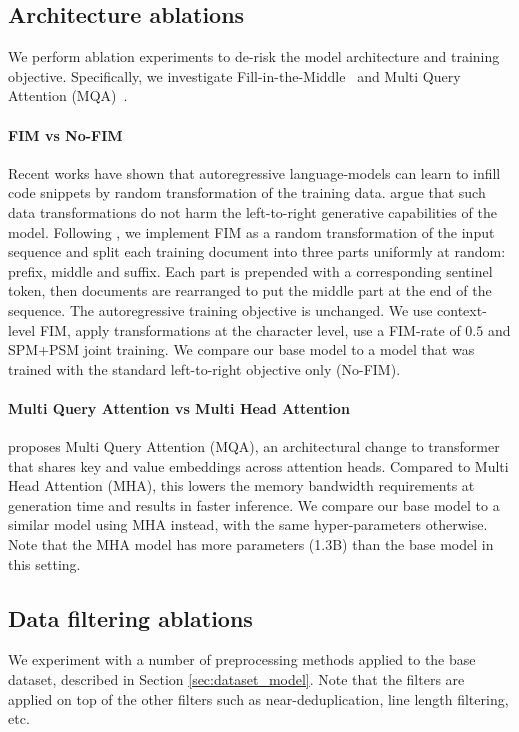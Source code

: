 \documentclass[10pt]{article} \usepackage{iclr2023_conference,times}
\begin{document}
\subsection{Architecture ablations}

We perform ablation experiments to de-risk the model architecture and training objective. Specifically, we investigate Fill-in-the-Middle~\citep{bavarian2022fim} and Multi Query Attention (MQA)~\citep{shazeer2019mqa}.


\paragraph{FIM vs No-FIM}
Recent works \citep{fried2022incoder, bavarian2022fim} have shown that autoregressive language-models can learn to infill code snippets by random transformation of the training data. \citet{bavarian2022fim} argue that such data transformations do not harm the left-to-right generative capabilities of the model. 
Following \citet{bavarian2022fim}, we implement FIM as a random transformation of the input sequence and split each training document into three parts uniformly at random: prefix, middle and suffix.
Each part is prepended with a corresponding sentinel token, then documents are rearranged to put the middle part at the end of the sequence. The autoregressive training objective is unchanged. We use context-level FIM, apply transformations at the character level, use a FIM-rate of $0.5$ and SPM+PSM joint training. We compare our base model to a model that was trained with the standard left-to-right objective only (No-FIM).


\paragraph{Multi Query Attention vs Multi Head Attention}
\citet{shazeer2019mqa} proposes Multi Query Attention (MQA), an architectural change to transformer that shares key and value embeddings across attention heads. Compared to Multi Head Attention (MHA), this lowers the memory bandwidth requirements at generation time and results in faster inference. We compare our base model to a similar model using MHA instead, with the same hyper-parameters otherwise. Note that the MHA model has more parameters (1.3B) than the base model in this setting. 




\subsection{Data filtering ablations}
We experiment with a number of preprocessing methods applied to the base dataset, described in Section \ref{sec:dataset_model}. Note that the filters are applied on top of the other filters such as near-deduplication, line length filtering, etc.  
\end{document}
